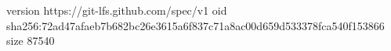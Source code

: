 version https://git-lfs.github.com/spec/v1
oid sha256:72ad47afaeb7b682bc26e3615a6f837c71a8ac00d659d533378fca540f153866
size 87540

